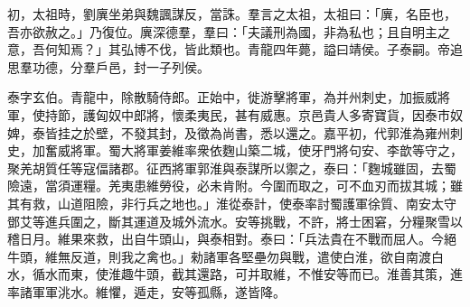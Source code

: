 \begin{pinyinscope}
 
初，太祖時，劉廙坐弟與魏諷謀反，當誅。羣言之太祖，太祖曰：「廙，名臣也，吾亦欲赦之。」乃復位。廙深德羣，羣曰：「夫議刑為國，非為私也；且自明主之意，吾何知焉？」其弘博不伐，皆此類也。青龍四年薨，謚曰靖侯。子泰嗣。帝追思羣功德，分羣戶邑，封一子列侯。
 
 
 
 
 泰字玄伯。青龍中，除散騎侍郎。正始中，徙游擊將軍，為并州刺史，加振威將軍，使持節，護匈奴中郎將，懷柔夷民，甚有威惠。京邑貴人多寄寶貨，因泰市奴婢，泰皆挂之於壁，不發其封，及徵為尚書，悉以還之。嘉平初，代郭淮為雍州刺史，加奮威將軍。蜀大將軍姜維率衆依麴山築二城，使牙門將句安、李歆等守之，聚羌胡質任等寇偪諸郡。征西將軍郭淮與泰謀所以禦之，泰曰：「麴城雖固，去蜀險遠，當須運糧。羌夷患維勞役，必未肯附。今圍而取之，可不血刃而拔其城；雖其有救，山道阻險，非行兵之地也。」淮從泰計，使泰率討蜀護軍徐質、南安太守鄧艾等進兵圍之，斷其運道及城外流水。安等挑戰，不許，將士困窘，分糧聚雪以稽日月。維果來救，出自牛頭山，與泰相對。泰曰：「兵法貴在不戰而屈人。今絕牛頭，維無反道，則我之禽也。」勑諸軍各堅壘勿與戰，遣使白淮，欲自南渡白水，循水而東，使淮趣牛頭，截其還路，可并取維，不惟安等而已。淮善其策，進率諸軍軍洮水。維懼，遁走，安等孤縣，遂皆降。
 

\end{pinyinscope}
